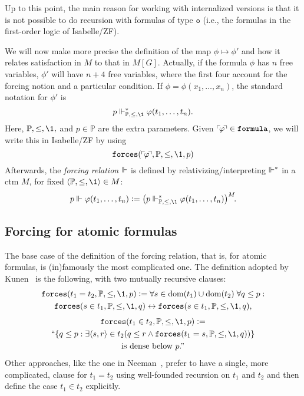 \documentclass[11pt,english]{article}
\renewcommand{\PP}{\mathbb{P}}
\newcommand{\formula}{\ensuremath{\mathtt{formula}}}
\newcommand{\tyo}{\mathtt{o}}
\newcommand{\forceisa}{\mathtt{forces}}
\begin{document}
Up to this point, the main reason for working with internalized
versions is that  it is not possible to do recursion with formulas of
type $\tyo$ (i.e., the formulas in the first-order logic of
Isabelle/ZF).

We will now make more precise the definition of the map
$\phi\mapsto\phi'$ and how it relates satisfaction in $M$ to that in
$M[G]$. Actually, if the formula $\phi$ has $n$ free variables,
$\phi'$ will have $n+4$ free variables, where the first four account
for the forcing notion and a particular condition. If
$\phi=\phi(x_1,\dots,x_n)$, the standard notation for $\phi'$ is
\[
p\forces_{\PP,\leq,\1}^* \phi(t_1,\dots,t_n).
\]
Here, $\PP,\leq,\1,$ and $p\in\PP$ are the extra parameters. 
Given $\quine\phi\in\formula$, we will write this  in
Isabelle/ZF by using  
\[
\forceisa(\quine\phi,\PP,\leq,\1,p)
\]
Afterwards, the \emph{forcing relation} $\Vdash$ is defined by
relativizing/interpreting $\Vdash^*$ in a ctm $M$, for fixed
$\lb\PP,\leq,\1\rb\in M$:
\[
p\forces \phi(t_1,\dots,t_n) \defi 
\bigl(p\forces_{\PP,\leq,\1}^* \phi(t_1,\dots,t_n)\bigr)^M\!.
\]

\subsection{Forcing for atomic formulas}
The base case of the definition of the forcing relation, that is, for
atomic formulas, is (in)famously the most complicated one. 
The definition adopted by Kunen~\cite[p.~257]{kunen2011set} is the
following, with two mutually recursive clauses:
\begin{multline}\label{eq:def-forcing-equality}
  \forceisa({t_1= t_2},\PP,\leq,\1,p) \defi 
  \forall s\in\dom(t_1)\cup\dom(t_2)\;\forall q\leq p :\\
  \forceisa({s\in t_1},\PP,\leq,\1,q)\lsii 
  \forceisa({s\in t_1},\PP,\leq,\1,q),
\end{multline}
\begin{multline}\label{eq:def-forcing-membership}
  \forceisa({t_1\in t_2},\PP,\leq,\1,p) \defi  \\
  \text{``}\{q\leq p : \exists \lb s,r\rb\in t_2 (q\leq r \y
  \forceisa({t_1 =s},\PP,\leq,\1,q))\} \\
  \text{is dense below $p$.''}
\end{multline}
Other approaches, like the one in Neeman~\cite{neeman-course}, prefer
to have a single, more complicated, clause for $t_1=t_2$ using
well-founded recursion on $t_1$
and $t_2$ and then define the case $t_1\in t_2$ explicitly. 
\end{document}
